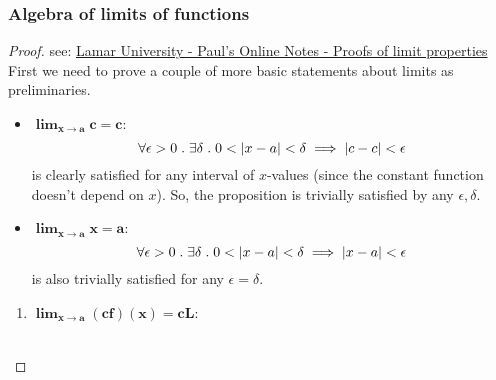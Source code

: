 \documentclass[MathsNotesBase.tex]{subfiles}
\begin{document}
{		\bigskip
		\subsubsection{Algebra of limits of functions}
		\begin{proof}
			see: \href{http://tutorial.math.lamar.edu/Classes/CalcI/LimitProofs.aspx}{Lamar University - Paul's Online Notes - Proofs of limit properties}
			First we need to prove a couple of more basic statements about limits as preliminaries.
			\begin{itemize}
				\item{${\bm{ \lim_{x \to a} c = c }}$:\\
					\[ \forall \epsilon > 0 \;.\; \exists \delta \;.\; 0 < \left\lvert x - a\right\rvert < \delta \implies \left\lvert c - c\right\rvert < \epsilon \]
					is clearly satisfied for any interval of $x$-values (since the constant function doesn't depend on $x$). So, the proposition is trivially satisfied by any ${ \epsilon,\delta }$.
				}
				\item{${\bm{ \lim_{x \to a} x = a }}$:\\
					\[ \forall \epsilon > 0 \;.\; \exists \delta \;.\; 0 < \left\lvert x - a\right\rvert < \delta \implies \left\lvert x - a\right\rvert < \epsilon \]
					is also trivially satisfied for any ${ \epsilon = \delta }$.
				}
			\end{itemize}
			\bigskip
			\begin{enumerate}[label=(\roman*)]
				\item{${\bm{ \lim_{x \to a} (cf)(x) = cL }}$:\\\\
}
\end{enumerate}
\end{proof}}
\end{document}
